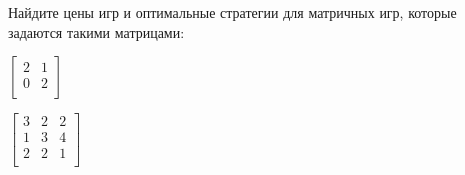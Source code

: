 Найдите цены игр и оптимальные стратегии для матричных игр, которые задаются такими матрицами:
\begin{enumcyr}
    \item
	    $\begin{bmatrix}
    	    2 & 1 \\
        	0 & 2 \\
        \end{bmatrix}$
        \vspace{0.1cm}
    \item
	    $\begin{bmatrix}
    	    3 & 2 & 2 \\
			1 & 3 & 4 \\
			2 & 2 & 1 \\
        \end{bmatrix}$
\end{enumcyr}